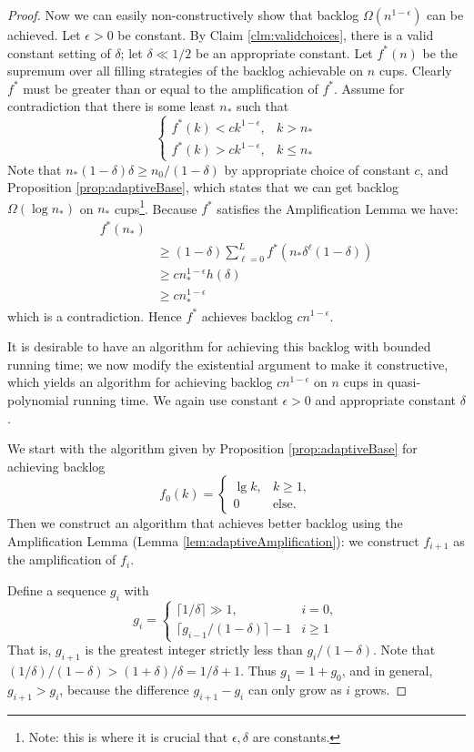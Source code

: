 \documentclass[twocolumn]{article}[10pt]
\begin{document}
\begin{proof}
  Now we can easily non-constructively show that backlog $\Omega(n^{1-\epsilon})$ can be achieved.
  Let $\epsilon > 0$ be constant. By Claim \ref{clm:validchoices}, there is a
  valid constant setting of $\delta$; let $\delta \ll 1/2$ be an appropriate
  constant. Let $f^*(n)$ be the supremum over all filling strategies of the
  backlog achievable on $n$ cups. Clearly $f^*$ must be greater than or equal to
  the amplification of $f^*$. Assume for contradiction that there is some least
  $n_*$ such that 
  $$\begin{cases}
    f^*(k)< ck^{1-\epsilon}, & k > n_*\\
    f^*(k)> ck^{1-\epsilon}, & k \le n_*
  \end{cases} $$
  Note that $n_*(1-\delta)\delta \ge n_0/(1-\delta)$ by appropriate choice of constant
  $c$, and Proposition \ref{prop:adaptiveBase}, which states that we can get
  backlog $\Omega(\log n_*)$ on $n_*$ cups\footnote{Note: this is where it is
  crucial that $\epsilon, \delta$ are constants.}.
  Because $f^*$ satisfies the Amplification Lemma we have:
\begin{align*}
  f^*(n_*) & \\
           &\ge (1-\delta)\sum_{\ell=0}^L f^*(n_*\delta^\ell(1-\delta)) \\
           &\ge cn_*^{1-\epsilon} h(\delta)\\
           &\ge cn_*^{1-\epsilon}
\end{align*}
which is a contradiction. Hence $f^*$ achieves backlog $cn^{1-\epsilon}$.

It is desirable to have an algorithm for achieving this backlog with bounded
running time; we now modify the existential argument to make it constructive, 
which yields an algorithm for achieving backlog $cn^{1-\epsilon}$ on $n$ cups 
in quasi-polynomial running time. We again use constant $\epsilon > 0$ and appropriate constant $\delta$.

  We start with the algorithm given by Proposition \ref{prop:adaptiveBase} for achieving backlog
  $$f_0(k) = 
  \begin{cases} 
    \lg k, & k\geq 1, \\
    0 & \text{else.}
  \end{cases}$$
  Then we construct an algorithm that achieves better backlog using the
  Amplification Lemma (Lemma \ref{lem:adaptiveAmplification}):
  we construct $f_{i+1}$ as the amplification of $f_{i}$. 

  Define a sequence $g_i$ with 
  $$ g_i = \begin{cases}
    \lceil 1/\delta \rceil \gg 1,  & i = 0,\\
    \lceil g_{i-1}/(1-\delta)\rceil -1 & i  \ge 1
  \end{cases} $$
  That is, $g_{i+1}$ is the greatest integer strictly less than $g_i/(1-\delta)$.
  Note that $ (1/\delta) / (1-\delta) > (1+\delta)/\delta = 1/\delta + 1.$
  Thus $g_1 = 1+ g_0$, and in general, $g_{i+1} > g_i$, because the difference
  $g_{i+1}-g_i$ can only grow as $i$ grows.


\end{proof}
\end{document}
